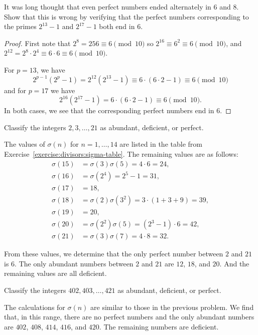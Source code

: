  It was long thought that even perfect numbers ended
alternately in $6$ and $8$. Show that this is wrong by verifying that
the perfect numbers corresponding to the primes $2^{13} - 1$ and
$2^{17} - 1$ both end in $6$.
\begin{proof}
  First note that $2^8 = 256\equiv6\pmod{10}$ so
  $2^{16}\equiv6^2\equiv6\pmod{10}$, and
  $2^{12} = 2^8\cdot2^4\equiv6\cdot6\equiv6\pmod{10}$.

  For $p = 13$, we have
  \begin{equation*}
    2^{p-1}(2^p - 1)
    = 2^{12}(2^{13} - 1)
    \equiv 6\cdot(6\cdot2 - 1)
    \equiv6\pmod{10}
  \end{equation*}
  and for $p = 17$ we have
  \begin{equation*}
    2^{16}(2^{17} - 1)
    = 6\cdot(6\cdot2 - 1)
    \equiv6\pmod{10}.
  \end{equation*}
  In both cases, we see that the corresponding perfect numbers end in
  $6$.
\end{proof}

 Classify the integers $2,3,\dots,21$ as abundant, deficient,
or perfect.
\begin{solution}
  The values of $\sigma(n)$ for $n = 1,\dots,14$ are listed in the
  table from Exercise~\ref{exercise:divisors:sigma-table}. The
  remaining values are as follows:
  \begin{align*}
    \sigma(15) &= \sigma(3)\sigma(5) = 4\cdot6 = 24, \\
    \sigma(16) &= \sigma(2^4) = 2^5 - 1 = 31, \\
    \sigma(17) &= 18, \\
    \sigma(18) &= \sigma(2)\sigma(3^2) = 3\cdot(1 + 3 + 9) = 39, \\
    \sigma(19) &= 20, \\
    \sigma(20) &= \sigma(2^2)\sigma(5) = (2^3 - 1)\cdot6 = 42, \\
    \sigma(21) &= \sigma(3)\sigma(7) = 4\cdot8 = 32.
  \end{align*}

  From these values, we determine that the only perfect number between
  $2$ and $21$ is $6$. The only abundant numbers between $2$ and $21$
  are $12$, $18$, and $20$. And the remaining values are all
  deficient.
\end{solution}

 Classify the integers $402, 403, \dots, 421$ as abundant,
deficient, or perfect.
\begin{solution}
  The calculations for $\sigma(n)$ are similar to those in the
  previous problem. We find that, in this range, there are no perfect
  numbers and the only abundant numbers are $402$, $408$, $414$,
  $416$, and $420$. The remaining numbers are deficient.
\end{solution}

